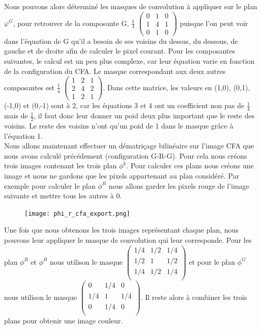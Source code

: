 \documentclass[a4paper,11pt]{article}
\begin{document}
  Nous pouvons alors déterminé les masques de convolution à appliquer sur le plan $\varphi^G$,
  pour retrouver de la composante G, $\frac{1}{4}$
  $\begin{pmatrix}
   0 & 1 & 0\\
   1 & 4 & 1\\
   0 & 1 & 0
  \end{pmatrix}$
  puisque l'on peut voir dans l'équation de G qu'il a besoin de ses voisins du dessus, du dessous,
  de gauche et de droite afin de calculer le pixel courant. Pour les composantes suivantes, le calcul
  est un peu plus complexe, car leur équation varie en fonction de la configuration du CFA. Le masque
  correspondant aux deux autres composantes est $\frac{1}{4}$
  $\begin{pmatrix}
   1 & 2 & 1\\
   2 & 4 & 2\\
   1 & 2 & 1
  \end{pmatrix}$. Dans cette matrice, les valeurs en (1,0), (0,1), (-1,0) et (0,-1) sont à 2, car 
  les équations 3 et 4 ont un coefficient non pas de $\frac{1}{4}$ mais de $\frac{1}{2}$, il faut
  donc leur donner un poid deux plus important que le reste des voisins. Le reste des voisins n'ont 
  qu'un poid de 1 dans le masque grâce à l'équation 1.\\
  
  Nous allons maintenant effectuer un dématriçage bilinéaire sur l'image CFA que nous avons calculé
  précédement (configuration G-R-G). Pour cela nous créons trois images contenant les trois plan $\phi^k$.
  Pour calculer ces plans nous créons une image et nous ne gardons que les pixels appartenant au plan considéré.
  Par exemple pour calculer le plan $\phi^R$ nous allons garder les pixels rouge de l'image suivante et mettre tous 
  les autres à 0.
  
  \begin{figure}[H]
  \center
   \texttt{[image: phi\_r\_cfa\_export.png]}
  \end{figure}

  Une fois que nous obtenons les trois images représentant chaque plan, nous pouvons leur appliquer le masque de
  convolution qui leur corresponde. Pour les plan $\phi^R$ et $\phi^B$ nous utilison le masque 
  $\begin{pmatrix}
    1/4 & 1/2 & 1/4\\
    1/2 & 1 & 1/2\\
    1/4 & 1/2 & 1/4\\
   \end{pmatrix}$ et pour le plan $\phi^G$ nous utilison le masque 
   $\begin{pmatrix}
    0 & 1/4 & 0\\
    1/4 & 1 & 1/4\\
    0 & 1/4 & 0\\
   \end{pmatrix}$.
   Il reste alors à combiner les trois plans pour obtenir une image couleur.\\
   
\end{document}
